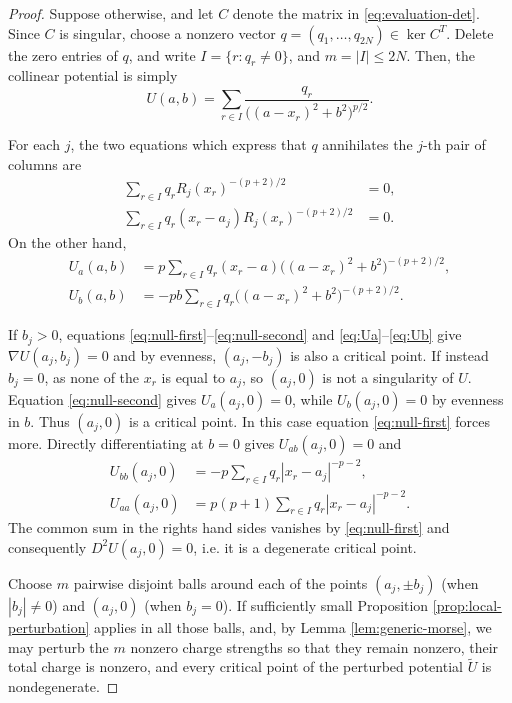 \documentclass[leqno,11pt]{amsart}
\numberwithin{equation}{section}
\theoremstyle{definition}
\begin{document}
	\begin{proof}
		Suppose otherwise, and let $C$ denote the matrix in \eqref{eq:evaluation-det}. Since $C$ is singular, choose a nonzero vector $q=(q_1,\ldots,q_{2N})\in\ker C^T$. Delete the zero entries of $q$, and write $I=\{r:q_r\neq0\}$, and $m=|I|\leq2N$. Then, the collinear potential is simply
		\begin{equation}\label{eq:Uaux}
			U(a,b)=\sum_{r\in I}\frac{q_r}{\big((a-x_r)^2+b^2\big)^{p/2}}.
		\end{equation}

		For each $j$, the two equations which express that $q$ annihilates the $j$-th pair of columns are
		\begin{align}
			\sum_{r\in I}q_rR_j(x_r)^{-(p+2)/2}&=0,
			\label{eq:null-first}\\
			\sum_{r\in I}q_r(x_r-a_j)R_j(x_r)^{-(p+2)/2}&=0.
			\label{eq:null-second}
		\end{align}
		On the other hand,
		\begin{align}
			U_a(a,b)
			&=p\sum_{r\in I}q_r(x_r-a)
			\big((a-x_r)^2+b^2\big)^{-(p+2)/2},
			\label{eq:Ua}\\
			U_b(a,b)
			&=-pb\sum_{r\in I}q_r
			\big((a-x_r)^2+b^2\big)^{-(p+2)/2}.
			\label{eq:Ub}
		\end{align}
		
		If $b_j>0$, equations \eqref{eq:null-first}--\eqref{eq:null-second} and \eqref{eq:Ua}--\eqref{eq:Ub} give $\nabla U(a_j,b_j)=0$ and by evenness, $(a_j,-b_j)$ is also a critical point. If instead $b_j=0$, as none of the $x_r$ is equal to $a_j$, so $(a_j,0)$ is not a singularity of $U$. Equation \eqref{eq:null-second} gives $U_a(a_j,0)=0$, while $U_b(a_j,0)=0$ by evenness in $b$. Thus $(a_j,0)$ is a critical point. In this case equation \eqref{eq:null-first} forces more. Directly differentiating at $b=0$ gives $U_{ab}(a_j,0)=0$ and
		\begin{align*}
			U_{bb}(a_j,0)
			&=-p\sum_{r\in I}q_r|x_r-a_j|^{-p-2},\\
			U_{aa}(a_j,0)
			&=p(p+1)\sum_{r\in I}q_r|x_r-a_j|^{-p-2}.
		\end{align*}
		The common sum in the rights hand sides vanishes by \eqref{eq:null-first} and consequently $
		D^2U(a_j,0)=0$, i.e. it is a degenerate critical point.
		
		Choose $m$ pairwise disjoint balls around each of the points $(a_j,\pm b_j)$ (when $|b_j| \neq 0$) and $(a_j,0)$ (when $b_j=0$). If sufficiently small Proposition \ref{prop:local-perturbation} applies in all those balls, and, by Lemma \ref{lem:generic-morse}, we may perturb the $m$ nonzero charge strengths so that they remain nonzero, their total charge is nonzero, and every critical point of the perturbed potential $\widetilde U$ is nondegenerate. 
		

\end{proof}
\end{document}
